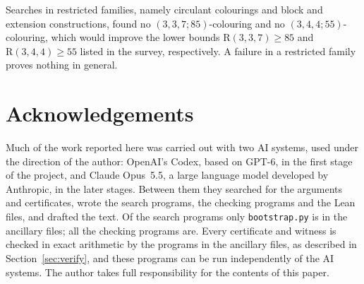 \documentclass[11pt]{article}
\theoremstyle{spacedplain}
\theoremstyle{spaceddef}
\theoremstyle{spacedremark}
\newcommand{\R}{\mathrm{R}}
\begin{document}
Searches in restricted families, namely circulant colourings and block and extension constructions, found no $(3,3,7;85)$-colouring and no $(3,4,4;55)$-colouring, which would improve the lower bounds $\R(3,3,7)\ge 85$ and $\R(3,4,4)\ge 55$ listed in the survey, respectively.
A failure in a restricted family proves nothing in general.
\section*{Acknowledgements}
Much of the work reported here was carried out with two AI systems, used under the direction of the author: OpenAI's Codex, based on GPT-6, in the first stage of the project, and Claude Opus~5.5, a large language model developed by Anthropic, in the later stages.
Between them they searched for the arguments and certificates, wrote the search programs, the checking programs and the Lean files, and drafted the text.
Of the search programs only \texttt{bootstrap.py} is in the ancillary files; all the checking programs are.
Every certificate and witness is checked in exact arithmetic by the programs in the ancillary files, as described in Section~\ref{sec:verify}, and these programs can be run independently of the AI systems.
The author takes full responsibility for the contents of this paper.
\end{document}
